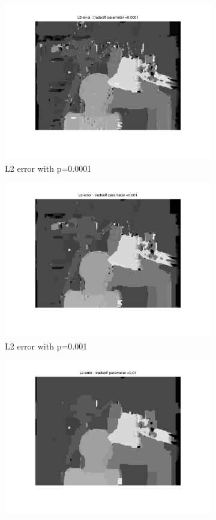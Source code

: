 \documentclass[fleqn]{article}
\begin{document}
\begin{figure}[!ht]
\begin{subfigure}{0.5\textwidth}
\includegraphics[scale=0.2]{./pics/tsukuba_L2_error_p=0.0001.jpg}
\caption{L2 error with p=0.0001}
\end{subfigure}
 \begin{subfigure}{0.5\textwidth}
\includegraphics[scale=0.2]{./pics/tsukuba_L2_error_p=0.001.jpg}
\caption{L2 error with p=0.001}
\end{subfigure}
 \begin{subfigure}{0.5\textwidth}
\includegraphics[scale=0.2]{./pics/tsukuba_L2_error_p=0.01.jpg}

\end{subfigure}
\end{figure}
\end{document}
